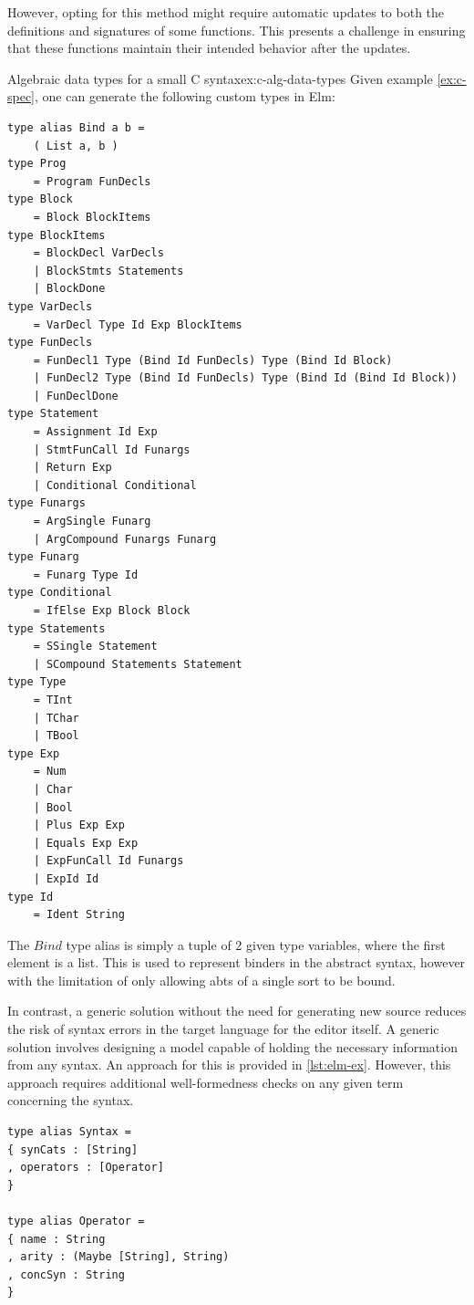 However, opting for this method might require automatic updates to both the
definitions and signatures of some functions.
This presents a challenge in ensuring that these functions maintain their intended
behavior after the updates.

\begin{example}{Algebraic data types for a small C syntax}{ex:c-alg-data-types}
  Given example \cref{ex:c-spec}, one can generate the following custom types in Elm:
  \begin{lstlisting}
type alias Bind a b =
    ( List a, b )
type Prog
    = Program FunDecls
type Block
    = Block BlockItems
type BlockItems
    = BlockDecl VarDecls
    | BlockStmts Statements
    | BlockDone
type VarDecls
    = VarDecl Type Id Exp BlockItems
type FunDecls
    = FunDecl1 Type (Bind Id FunDecls) Type (Bind Id Block)
    | FunDecl2 Type (Bind Id FunDecls) Type (Bind Id (Bind Id Block))
    | FunDeclDone
type Statement
    = Assignment Id Exp
    | StmtFunCall Id Funargs
    | Return Exp
    | Conditional Conditional
type Funargs
    = ArgSingle Funarg
    | ArgCompound Funargs Funarg
type Funarg
    = Funarg Type Id
type Conditional
    = IfElse Exp Block Block
type Statements
    = SSingle Statement
    | SCompound Statements Statement
type Type
    = TInt
    | TChar
    | TBool
type Exp
    = Num
    | Char
    | Bool
    | Plus Exp Exp
    | Equals Exp Exp
    | ExpFunCall Id Funargs
    | ExpId Id
type Id
    = Ident String
\end{lstlisting}

  The $Bind$ type alias is simply a tuple of 2 given type variables,
  where the first element is a list. This is used to represent binders in the
  abstract syntax, however with the limitation of only allowing abts of a single
  sort to be bound. 
\end{example}

In contrast, a generic solution without the need for generating new source reduces the risk of syntax errors in the target language for the editor itself. A generic solution involves designing a model capable of holding the necessary information from any syntax. An approach for this is provided in \cref{lst:elm-ex}. However, this approach requires additional well-formedness checks on any given term concerning the syntax.

\begin{lstlisting}[backgroundcolor=\color{myfigurecolorback},caption={Elm Records for storing syntax information},label={lst:elm-ex}]
type alias Syntax =
{ synCats : [String]
, operators : [Operator]
}

type alias Operator =
{ name : String
, arity : (Maybe [String], String)
, concSyn : String
}
\end{lstlisting}

